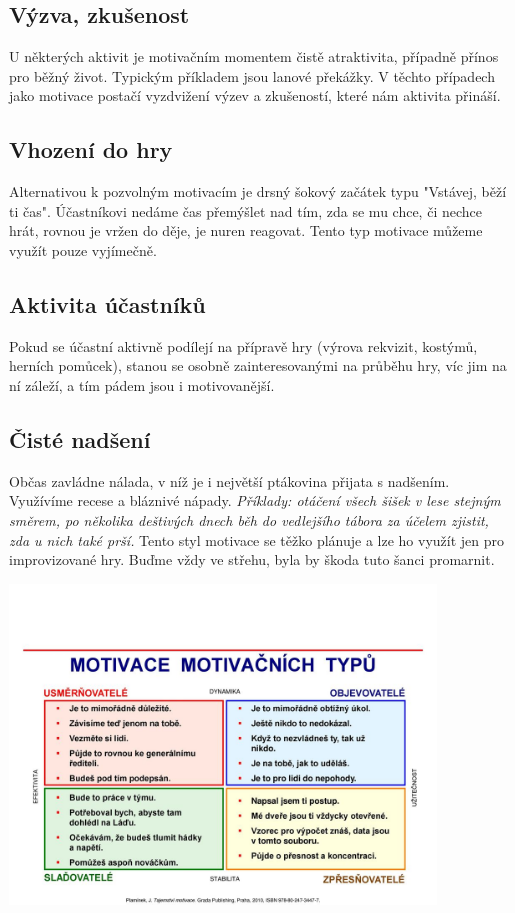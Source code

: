 \documentclass[a4paper,12pt]{report}
\begin{document}
\subsection*{Výzva, zkušenost}
U některých aktivit je motivačním momentem čistě atraktivita, případně přínos pro běžný život. Typickým příkladem jsou lanové překážky. V těchto případech jako motivace postačí vyzdvižení výzev a zkušeností, které nám aktivita přináší.

\pagelogos
\subsection*{Vhození do hry}
Alternativou k pozvolným motivacím je drsný šokový začátek typu "Vstávej, běží ti čas". Účastníkovi nedáme čas přemýšlet nad tím, zda se mu chce, či nechce hrát, rovnou je vržen do děje, je nuren reagovat. Tento typ motivace můžeme využít pouze vyjímečně.

\subsection*{Aktivita účastníků}
Pokud se účastní aktivně podílejí na přípravě hry (výrova rekvizit, kostýmů, herních pomůcek), stanou se osobně zainteresovanými na průběhu hry, víc jim na ní záleží, a tím pádem jsou i motivovanější.

\subsection*{Čisté nadšení}
Občas zavládne nálada, v níž je i největší ptákovina přijata s nadšením. Využívíme recese a bláznivé nápady. 
\textit{Příklady: otáčení všech šišek v lese stejným směrem, po několika deštivých dnech běh do vedlejšího tábora za účelem zjistit, zda u nich také prší.}
Tento styl motivace se těžko plánuje a lze ho využít jen pro improvizované hry. Buďme vždy ve střehu, byla by škoda tuto šanci promarnit.

\begin{center}
\includegraphics[width=0.85\textwidth]{zdroje/MOTIVACE+MOTIVAČNÍCH+TYPŮ.jpg}
\end{center}
\end{document}
